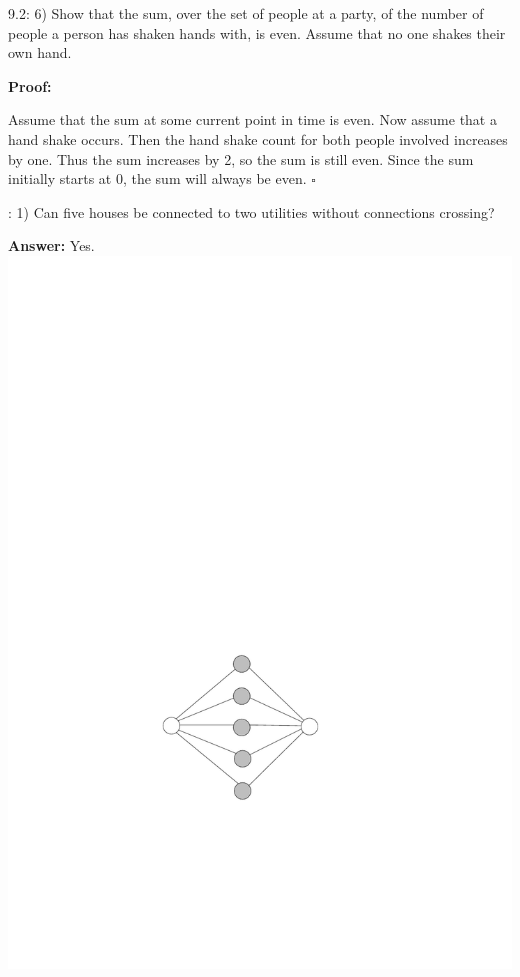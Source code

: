 \documentclass{article}
\newenvironment{proof}
{\color{PineGreen}\begin{list}{}%
         {\setlength{\leftmargin}{1cm}}%
         \item[]%
        \textbf{Proof:}
        
        }
{ $\square$\end{list}}
\newenvironment{answer}
{\color{PineGreen}\begin{list}{}%
         {\setlength{\leftmargin}{1cm}}%
         \item[]%
        \textbf{Answer: }}
{\end{list}}
\begin{document}
9.2: 6) Show that the sum, over the set of people at a party, of the number of people a person has shaken hands with, is even.  Assume that no one shakes their own hand.
\begin{proof}
Assume that the sum at some current point in time is even. Now assume that a hand shake occurs. Then the hand shake count for both people involved increases by one. Thus the sum increases by 2, so the sum is still even. Since the sum initially starts at 0, the sum will always be even.
\end{proof}
9.7: 1) Can five houses be connected to two utilities without connections crossing?
\begin{answer}
Yes.
\includegraphics[scale=0.75]{graph.pdf}
\end{answer}
\end{document}
